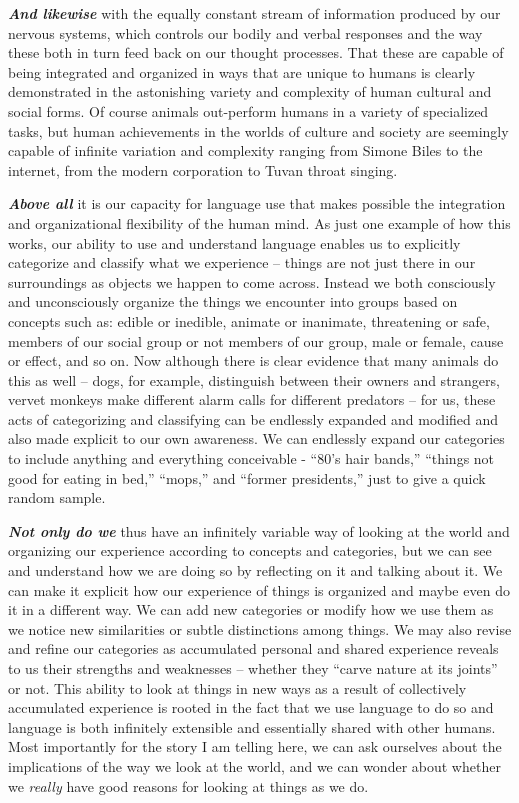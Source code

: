 \documentclass[12pt, openany]{book}
\begin{document}
\textbf{\emph{And likewise}} with the equally constant stream of information produced by our nervous systems, which controls our bodily and verbal responses and the way these both in turn feed back on our thought processes. That these are capable of being integrated and organized in ways that are unique to humans is clearly demonstrated in the astonishing variety and complexity of human cultural and social forms. Of course animals out-perform humans in a variety of specialized tasks, but human achievements in the worlds of culture and society are seemingly capable of infinite variation and complexity ranging from Simone Biles to the internet, from the modern corporation to Tuvan throat singing.

\textbf{\emph{Above all}} it is our capacity for language use that makes possible the integration and organizational flexibility of the human mind. As just one example of how this works, our ability to use and understand language enables us to explicitly categorize and classify what we experience -- things are not just there in our surroundings as objects we happen to come across. Instead we both consciously and unconsciously organize the things we encounter into groups based on concepts such as: edible or inedible, animate or inanimate, threatening or safe, members of our social group or not members of our group, male or female, cause or effect, and so on. Now although there is clear evidence that many animals do this as well -- dogs, for example, distinguish between their owners and strangers, vervet monkeys make different alarm calls for different predators -- for us, these acts of categorizing and classifying can be endlessly expanded and modified and also made explicit to our own awareness. We can endlessly expand our categories to include anything and everything conceivable - ``80's hair bands,'' ``things not good for eating in bed,'' ``mops,'' and ``former presidents,'' just to give a quick random sample.

\textbf{\emph{Not only do we}} thus have an infinitely variable way of looking at the world and organizing our experience according to concepts and categories, but we can see and understand how we are doing so by reflecting on it and talking about it. We can make it explicit how our experience of things is organized and maybe even do it in a different way. We can add new categories or modify how we use them as we notice new similarities or subtle distinctions among things. We may also revise and refine our categories as accumulated personal and shared experience reveals to us their strengths and weaknesses -- whether they ``carve nature at its joints'' or not. This ability to look at things in new ways as a result of collectively accumulated experience is rooted in the fact that we use language to do so and language is both infinitely extensible and essentially shared with other humans. Most importantly for the story I am telling here, we can ask ourselves about the implications of the way we look at the world, and we can wonder about whether we \emph{really} have good reasons for looking at things as we do.
\end{document}

